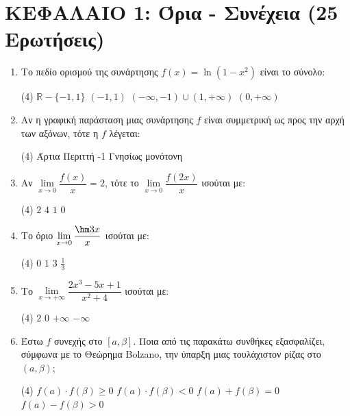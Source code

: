 \section*{ΚΕΦΑΛΑΙΟ 1: Όρια - Συνέχεια (25 Ερωτήσεις)}

\begin{enumerate}[label=\textbf{1.\arabic*.}, itemsep=4mm]
    \item Το πεδίο ορισμού της συνάρτησης $f(x) = \ln(1 - x^2)$ είναι το σύνολο:
    \begin{tasks}[label=\let\textdexiakeraia\relax\alph*.](4)
        \task $\mathbb{R} - \{-1, 1\}$
        \task $(-1, 1)$
        \task $(-\infty, -1) \cup (1, +\infty)$
        \task $(0, +\infty)$
    \end{tasks}

    \item Αν η γραφική παράσταση μιας συνάρτησης $f$ είναι συμμετρική ως προς την αρχή των αξόνων, τότε η $f$ λέγεται:
    \begin{tasks}[label=\let\textdexiakeraia\relax\alph*.](4)
        \task Άρτια
        \task Περιττή
        -1
        \task Γνησίως μονότονη
    \end{tasks}

    \item Αν $\lim\limits_{x \to 0} \dfrac{f(x)}{x} = 2$, τότε το $\lim\limits_{x \to 0} \dfrac{f(2x)}{x}$ ισούται με:
    \begin{tasks}[label=\let\textdexiakeraia\relax\alph*.](4)
        \task $2$
        \task $4$
        \task $1$
        \task $0$
    \end{tasks}

    \item Το όριο $\lim\limits_{x \to 0} \dfrac{\hm 3x}{x}$ ισούται με:
    \begin{tasks}[label=\let\textdexiakeraia\relax\alph*.](4)
        \task $0$
        \task $1$
        \task $3$
        \task $\frac{1}{3}$
    \end{tasks}

    \item Το $\lim\limits_{x \to +\infty} \dfrac{2x^3 - 5x + 1}{x^2 + 4}$ ισούται με:
    \begin{tasks}[label=\let\textdexiakeraia\relax\alph*.](4)
        \task $2$
        \task $0$
        \task $+\infty$
        \task $-\infty$
    \end{tasks}

    \item Έστω $f$ συνεχής στο $[a, \beta]$. Ποια από τις παρακάτω συνθήκες εξασφαλίζει, σύμφωνα με το Θεώρημα Bolzano, την ύπαρξη μιας τουλάχιστον ρίζας στο $(a, \beta)$;
    \begin{tasks}[label=\let\textdexiakeraia\relax\alph*.](4)
        \task $f(a) \cdot f(\beta) \ge 0$
        \task $f(a) \cdot f(\beta) < 0$
        \task $f(a) + f(\beta) = 0$
        \task $f(a) - f(\beta) > 0$
    \end{tasks}


\end{enumerate}
